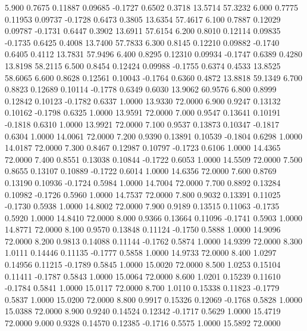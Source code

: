    5.900   0.7675   0.11887   0.09685  -0.1727   0.6502   0.3718  13.5714  57.3232
   6.000   0.7775   0.11953   0.09737  -0.1728   0.6473   0.3805  13.6354  57.4617
   6.100   0.7887   0.12029   0.09787  -0.1731   0.6447   0.3902  13.6911  57.6154
   6.200   0.8010   0.12114   0.09835  -0.1735   0.6425   0.4008  13.7400  57.7833
   6.300   0.8145   0.12210   0.09882  -0.1740   0.6405   0.4112  13.7831  57.9496
   6.400   0.8295   0.12310   0.09934  -0.1747   0.6389   0.4280  13.8198  58.2115
   6.500   0.8454   0.12424   0.09988  -0.1755   0.6374   0.4533  13.8525  58.6065
   6.600   0.8628   0.12561   0.10043  -0.1764   0.6360   0.4872  13.8818  59.1349
   6.700   0.8823   0.12689   0.10114  -0.1778   0.6349   0.6030  13.9062  60.9576
   6.800   0.8999   0.12842   0.10123  -0.1782   0.6337   1.0000  13.9330  72.0000
   6.900   0.9247   0.13132   0.10162  -0.1798   0.6325   1.0000  13.9591  72.0000
   7.000   0.9547   0.13641   0.10191  -0.1818   0.6310   1.0000  13.9921  72.0000
   7.100   0.9537   0.13873   0.10347  -0.1817   0.6304   1.0000  14.0061  72.0000
   7.200   0.9390   0.13891   0.10539  -0.1804   0.6298   1.0000  14.0187  72.0000
   7.300   0.8467   0.12987   0.10797  -0.1723   0.6106   1.0000  14.4365  72.0000
   7.400   0.8551   0.13038   0.10844  -0.1722   0.6053   1.0000  14.5509  72.0000
   7.500   0.8655   0.13107   0.10889  -0.1722   0.6014   1.0000  14.6356  72.0000
   7.600   0.8769   0.13190   0.10936  -0.1724   0.5984   1.0000  14.7004  72.0000
   7.700   0.8892   0.13284   0.10982  -0.1726   0.5960   1.0000  14.7537  72.0000
   7.800   0.9032   0.13391   0.11025  -0.1730   0.5938   1.0000  14.8002  72.0000
   7.900   0.9189   0.13515   0.11063  -0.1735   0.5920   1.0000  14.8410  72.0000
   8.000   0.9366   0.13664   0.11096  -0.1741   0.5903   1.0000  14.8771  72.0000
   8.100   0.9570   0.13848   0.11124  -0.1750   0.5888   1.0000  14.9096  72.0000
   8.200   0.9813   0.14088   0.11144  -0.1762   0.5874   1.0000  14.9399  72.0000
   8.300   1.0111   0.14446   0.11135  -0.1777   0.5858   1.0000  14.9733  72.0000
   8.400   1.0297   0.14956   0.11215  -0.1789   0.5845   1.0000  15.0020  72.0000
   8.500   1.0253   0.15104   0.11411  -0.1787   0.5843   1.0000  15.0064  72.0000
   8.600   1.0201   0.15239   0.11610  -0.1784   0.5841   1.0000  15.0117  72.0000
   8.700   1.0110   0.15338   0.11823  -0.1779   0.5837   1.0000  15.0200  72.0000
   8.800   0.9917   0.15326   0.12069  -0.1768   0.5828   1.0000  15.0388  72.0000
   8.900   0.9240   0.14524   0.12342  -0.1717   0.5629   1.0000  15.4719  72.0000
   9.000   0.9328   0.14570   0.12385  -0.1716   0.5575   1.0000  15.5892  72.0000
